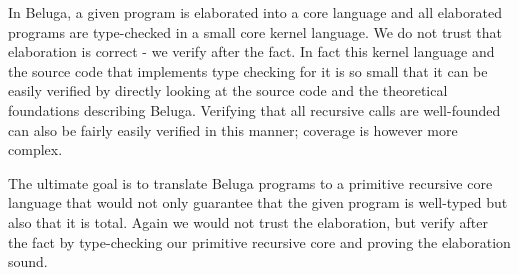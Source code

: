 In Beluga, a given program is elaborated into a core language and all elaborated programs are type-checked in a small core kernel language. We do not trust that elaboration is correct - we verify after the fact. In fact this kernel language and the source code that implements type checking for it is so small that it can be easily verified by directly looking at the source code and the theoretical foundations describing Beluga. Verifying that all recursive calls are well-founded can also be fairly easily verified in this manner; coverage is however more complex.

The ultimate goal is to translate Beluga programs to a primitive recursive core language that would not only guarantee that the given program is well-typed but also that it is total. Again we would not trust the elaboration, but verify after the fact by type-checking our primitive recursive core and proving the elaboration sound.

